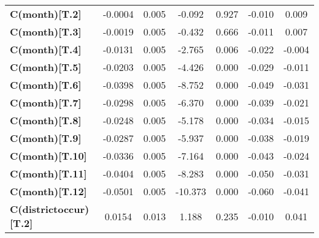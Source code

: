\begin{center}
\begin{tabular}{lcccccc}
\textbf{C(month)[T.2]}                                                            &      -0.0004  &        0.005     &    -0.092  &         0.927        &       -0.010    &        0.009     \\
\textbf{C(month)[T.3]}                                                            &      -0.0019  &        0.005     &    -0.432  &         0.666        &       -0.011    &        0.007     \\
\textbf{C(month)[T.4]}                                                            &      -0.0131  &        0.005     &    -2.765  &         0.006        &       -0.022    &       -0.004     \\
\textbf{C(month)[T.5]}                                                            &      -0.0203  &        0.005     &    -4.426  &         0.000        &       -0.029    &       -0.011     \\
\textbf{C(month)[T.6]}                                                            &      -0.0398  &        0.005     &    -8.752  &         0.000        &       -0.049    &       -0.031     \\
\textbf{C(month)[T.7]}                                                            &      -0.0298  &        0.005     &    -6.370  &         0.000        &       -0.039    &       -0.021     \\
\textbf{C(month)[T.8]}                                                            &      -0.0248  &        0.005     &    -5.178  &         0.000        &       -0.034    &       -0.015     \\
\textbf{C(month)[T.9]}                                                            &      -0.0287  &        0.005     &    -5.937  &         0.000        &       -0.038    &       -0.019     \\
\textbf{C(month)[T.10]}                                                           &      -0.0336  &        0.005     &    -7.164  &         0.000        &       -0.043    &       -0.024     \\
\textbf{C(month)[T.11]}                                                           &      -0.0404  &        0.005     &    -8.283  &         0.000        &       -0.050    &       -0.031     \\
\textbf{C(month)[T.12]}                                                           &      -0.0501  &        0.005     &   -10.373  &         0.000        &       -0.060    &       -0.041     \\
\textbf{C(districtoccur)[T.2]}                                                    &       0.0154  &        0.013     &     1.188  &         0.235        &       -0.010    &        0.041     \\

\end{tabular}
\end{center}
